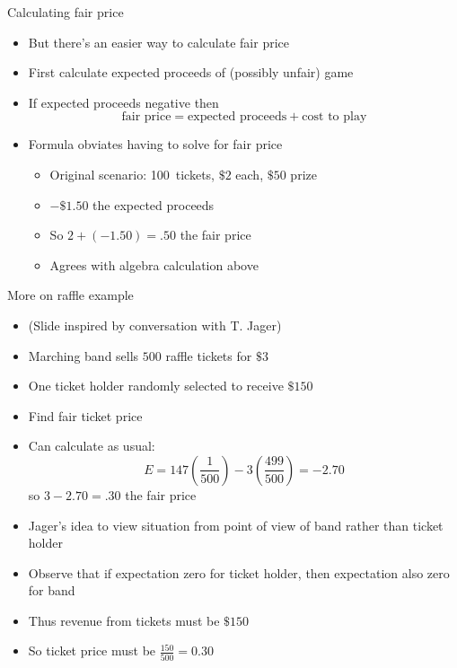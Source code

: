 \documentclass[handout]{beamer}
\theoremstyle{definition}
\begin{document}
\begin{frame}{Calculating fair price}
\begin{itemize}
\item But there's an easier way to calculate fair price
\item First calculate expected proceeds of (possibly unfair) game
\item If expected proceeds \alert{negative} then
\[\text{fair price}=\text{expected proceeds}+\text{cost to play}\]
\item Formula obviates having to solve for fair price
\begin{example}
\begin{itemize}
\item Original scenario: 100~tickets, $\$2$ each, $\$50$ prize
\item $-\$1.50$ the expected proceeds
\item So $2+\left(-1.50\right)=.50$ the fair price
\item Agrees with algebra calculation above
\end{itemize}
\end{example}
\end{itemize}
\end{frame}

\begin{frame}{More on raffle example}
\begin{itemize}
\item (Slide inspired by conversation with T. Jager)
\item Marching band sells $500$ raffle tickets for $\$3$
\item One ticket holder randomly selected to receive $\$150$
\item Find fair ticket price
\item Can calculate as usual:
\[E=147\left(\frac{1}{500}\right)-3\left(\frac{499}{500}\right)=-2.70\]
so $3-2.70=.30$ the fair price
\item Jager's idea to view situation from point of view
of band rather than ticket holder
\item Observe that if expectation zero for ticket holder,
then expectation also zero for band
\item Thus revenue from tickets must be $\$150$
\item So ticket price must be $\frac{150}{500}=0.30$
\end{itemize}
\end{frame}
\end{document}
